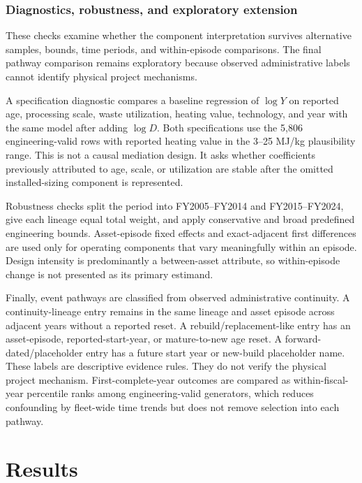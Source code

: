 \documentclass[12pt,letterpaper]{article}
\begin{document}
\subsubsection{Diagnostics, robustness, and exploratory extension}

These checks examine whether the component interpretation survives alternative
samples, bounds, time periods, and within-episode comparisons. The final
pathway comparison remains exploratory because observed administrative labels
cannot identify physical project mechanisms.

A specification diagnostic compares a baseline regression of $\log Y$ on
reported age, processing scale, waste utilization, heating value, technology,
and year with the same model after adding $\log D$. Both specifications use the
5,806 engineering-valid rows with reported heating value in the 3--25 MJ/kg
plausibility range. This is not a causal mediation design. It asks whether
coefficients previously attributed to age, scale, or utilization are stable
after the omitted installed-sizing component is represented.

Robustness checks split the period into FY2005--FY2014 and FY2015--FY2024, give
each lineage equal total weight, and apply conservative and broad predefined
engineering bounds. Asset-episode fixed effects and exact-adjacent first
differences are used only for operating components that vary meaningfully
within an episode. Design intensity is predominantly a between-asset attribute,
so within-episode change is not presented as its primary estimand.

Finally, event pathways are classified from observed administrative continuity.
A continuity-lineage entry remains in the same lineage and asset episode across
adjacent years without a reported reset. A rebuild/replacement-like entry has an
asset-episode, reported-start-year, or mature-to-new age reset. A
forward-dated/placeholder entry has a future start year or new-build placeholder
name. These labels are descriptive evidence rules. They do not verify the
physical project mechanism. First-complete-year outcomes are compared as
within-fiscal-year percentile ranks among engineering-valid generators, which
reduces confounding by fleet-wide time trends but does not remove selection into
each pathway.

\section{Results}
\end{document}
